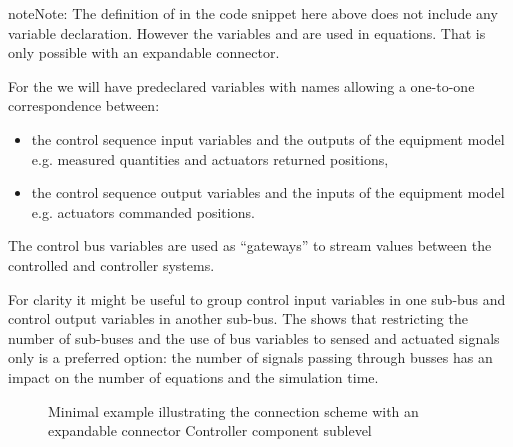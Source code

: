 \documentclass[letterpaper,10pt, openany,english]{sphinxmanual}
\begin{document}
\begin{sphinxadmonition}{note}{Note:}
The definition of  in the code snippet here above does not include any variable declaration. However the variables  and  are used in  equations. That is only possible with an expandable connector.

For the  we will have predeclared variables with names allowing a one-to-one correspondence between:
\begin{itemize}
\item {} 
the control sequence input variables and the outputs of the equipment model e.g. measured quantities and actuators returned positions,

\item {} 
the control sequence output variables and the inputs of the equipment model e.g. actuators commanded positions.

\end{itemize}

The control bus variables are used as “gateways” to stream values between the controlled and controller systems.

For clarity it might be useful to group control input variables in one sub-bus and control output variables in another sub-bus.
The  shows that restricting the number of sub-buses and the use of bus variables to sensed and actuated signals only is a preferred option: the number of signals passing through busses has an impact on the number of equations and the simulation time.
\end{sphinxadmonition}

\begin{figure}[htbp]
\centering
\capstart

\noindent{}
\caption{Minimal example illustrating the connection scheme with an expandable connector \textendash{} Controller component sublevel}\label{\detokenize{requirements:bustestcontrollerexp}}\end{figure}
\end{document}

